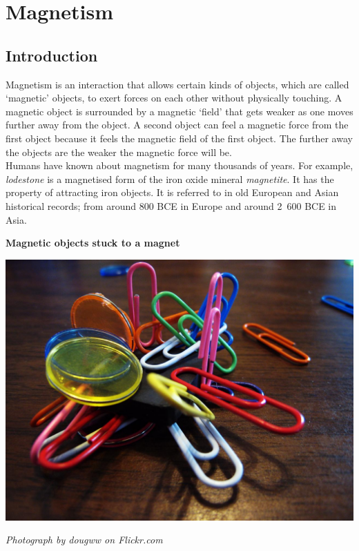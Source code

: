          \chapter{Magnetism}
    \setcounter{figure}{1}
    \setcounter{subfigure}{1}
    \label{m37830}
    \section{Introduction}

\begin{minipage}{.5\textwidth}
      \label{m37830*id127925}Magnetism is an interaction that allows certain kinds of objects, which are called `magnetic' objects, to exert forces on each other without physically touching. A magnetic object is surrounded by a magnetic `field' that gets weaker as one moves further away from the object. A second object can feel a magnetic force from the first object because it feels the magnetic field of the first object. The further away the objects are the weaker the magnetic force will be.\\
      \label{m37830*id127932}Humans have known about magnetism for many thousands of years.
For example, \textsl{lodestone} is a magnetised form of the iron oxide mineral
\textsl{magnetite}. It has the property of attracting iron
objects. It is referred to in old European and Asian historical
records; from around 800 \textsc{BCE} in Europe and around
2~600 \textsc{BCE} in Asia.\par
\end{minipage}
\begin{minipage}{.5\textwidth}
\begin{center}
\textbf{Magnetic objects stuck to a magnet}\par
 \includegraphics[width=.8\textwidth]{photos/magnet_mess_dougww.jpg}\par
\textit{Photograph by dougww on Flickr.com}
\end{center}
\end{minipage}
 
